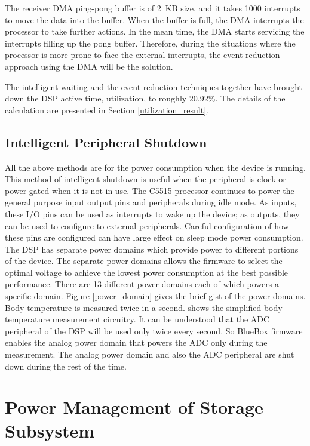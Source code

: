 The receiver DMA ping-pong buffer is of 2~KB size, and it takes 1000
interrupts to move the data into the buffer. When the buffer is full,
the DMA interrupts the processor to take further actions. In the mean
time, the DMA starts servicing the interrupts filling up the pong
buffer. Therefore, during the situations where the processor is more
prone to face the external interrupts, the event reduction approach
using the DMA will be the solution.
 
The intelligent waiting and the event reduction techniques together
have brought down the DSP active time, utilization, to roughly
20.92\%. The details of the calculation are presented in Section
\ref{utilization_result}.

\subsection{Intelligent Peripheral Shutdown}

All the above methods are for the power consumption when the device
is running. This method of intelligent shutdown is useful when the
peripheral is clock or power gated when it is not in use. The C5515
processor continues to power the general purpose input output pins
and peripherals during idle mode. As inputs, these I/O pins can be
used as interrupts to wake up the device; as outputs, they can be
used to configure to external peripherals. Careful configuration of
how these pins are configured can have large effect on sleep mode
power consumption. The DSP has separate power domains which provide
power to different portions of the device. The separate power domains
allows the firmware to select the optimal voltage to achieve the
lowest power consumption at the best possible performance. There are
13 different power domains each of which powers a specific domain.
Figure \ref{power_domain} gives the brief gist of the power domains.
Body temperature is measured twice in a second. 
 shows the simplified body temperature measurement
circuitry. It can be understood that the ADC peripheral of the DSP
will be used only twice every second. So BlueBox firmware enables the
analog power domain that powers the ADC only during the measurement.
The analog power domain and also the ADC peripheral are shut down
during the rest of the time. 

\section{Power Management of Storage Subsystem}

